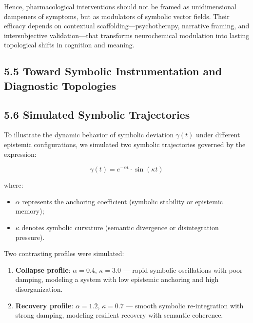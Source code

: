 Hence, pharmacological interventions should not be framed as unidimensional dampeners of symptoms, but as modulators of symbolic vector fields. Their efficacy depends on contextual scaffolding—psychotherapy, narrative framing, and intersubjective validation—that transforms neurochemical modulation into lasting topological shifts in cognition and meaning.


\subsection*{5.5 Toward Symbolic Instrumentation and Diagnostic Topologies}


\subsection*{5.6 Simulated Symbolic Trajectories}

To illustrate the dynamic behavior of symbolic deviation $\gamma(t)$ under different epistemic configurations, we simulated two symbolic trajectories governed by the expression:

\begin{equation}
\gamma(t) = e^{-\alpha t} \cdot \sin(\kappa t)
\end{equation}

where:
\begin{itemize}
  \item $\alpha$ represents the anchoring coefficient (symbolic stability or epistemic memory);
  \item $\kappa$ denotes symbolic curvature (semantic divergence or disintegration pressure).
\end{itemize}

Two contrasting profiles were simulated:

\begin{enumerate}
  \item \textbf{Collapse profile}: $\alpha = 0.4$, $\kappa = 3.0$ — rapid symbolic oscillations with poor damping, modeling a system with low epistemic anchoring and high disorganization.
  \item \textbf{Recovery profile}: $\alpha = 1.2$, $\kappa = 0.7$ — smooth symbolic re-integration with strong damping, modeling resilient recovery with semantic coherence.
\end{enumerate}

